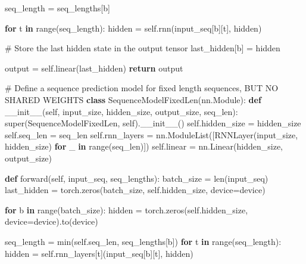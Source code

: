 \documentclass[
  letterpaper,
  DIV=11,
  numbers=noendperiod]{scrartcl}
\newenvironment{Shaded}{\begin{snugshade}}{\end{snugshade}}
\newcommand{\BuiltInTok}[1]{\textcolor[rgb]{0.00,0.23,0.31}{#1}}
\newcommand{\CommentTok}[1]{\textcolor[rgb]{0.37,0.37,0.37}{#1}}
\newcommand{\ControlFlowTok}[1]{\textcolor[rgb]{0.00,0.23,0.31}{\textbf{#1}}}
\newcommand{\FunctionTok}[1]{\textcolor[rgb]{0.28,0.35,0.67}{#1}}
\newcommand{\KeywordTok}[1]{\textcolor[rgb]{0.00,0.23,0.31}{\textbf{#1}}}
\newcommand{\NormalTok}[1]{\textcolor[rgb]{0.00,0.23,0.31}{#1}}
\newcommand{\OperatorTok}[1]{\textcolor[rgb]{0.37,0.37,0.37}{#1}}
\newcommand{\VariableTok}[1]{\textcolor[rgb]{0.07,0.07,0.07}{#1}}
\begin{document}
\begin{Shaded}
\begin{Highlighting}[]
\NormalTok{            seq\_length }\OperatorTok{=}\NormalTok{  seq\_lengths[b]}

            \ControlFlowTok{for}\NormalTok{ t }\KeywordTok{in} \BuiltInTok{range}\NormalTok{(seq\_length):}
\NormalTok{                hidden }\OperatorTok{=} \VariableTok{self}\NormalTok{.rnn(input\_seq[b][t], hidden)}

            \CommentTok{\# Store the last hidden state in the output tensor}
\NormalTok{            last\_hidden[b] }\OperatorTok{=}\NormalTok{ hidden}

\NormalTok{        output }\OperatorTok{=} \VariableTok{self}\NormalTok{.linear(last\_hidden)}
        \ControlFlowTok{return}\NormalTok{ output}

\CommentTok{\# Define a sequence prediction model for fixed length sequences, BUT NO SHARED WEIGHTS}
\KeywordTok{class}\NormalTok{ SequenceModelFixedLen(nn.Module):}
    \KeywordTok{def} \FunctionTok{\_\_init\_\_}\NormalTok{(}\VariableTok{self}\NormalTok{, input\_size, hidden\_size, output\_size, seq\_len):}
        \BuiltInTok{super}\NormalTok{(SequenceModelFixedLen, }\VariableTok{self}\NormalTok{).}\FunctionTok{\_\_init\_\_}\NormalTok{()}
        \VariableTok{self}\NormalTok{.hidden\_size }\OperatorTok{=}\NormalTok{ hidden\_size}
        \VariableTok{self}\NormalTok{.seq\_len }\OperatorTok{=}\NormalTok{ seq\_len}
        \VariableTok{self}\NormalTok{.rnn\_layers }\OperatorTok{=}\NormalTok{ nn.ModuleList([RNNLayer(input\_size, hidden\_size) }\ControlFlowTok{for}\NormalTok{ \_ }\KeywordTok{in} \BuiltInTok{range}\NormalTok{(seq\_len)])}
        \VariableTok{self}\NormalTok{.linear }\OperatorTok{=}\NormalTok{ nn.Linear(hidden\_size, output\_size)}

    \KeywordTok{def}\NormalTok{ forward(}\VariableTok{self}\NormalTok{, input\_seq, seq\_lengths):}
\NormalTok{        batch\_size }\OperatorTok{=} \BuiltInTok{len}\NormalTok{(input\_seq)}
\NormalTok{        last\_hidden }\OperatorTok{=}\NormalTok{ torch.zeros(batch\_size, }\VariableTok{self}\NormalTok{.hidden\_size, device}\OperatorTok{=}\NormalTok{device)}

        \ControlFlowTok{for}\NormalTok{ b }\KeywordTok{in} \BuiltInTok{range}\NormalTok{(batch\_size):}
\NormalTok{            hidden }\OperatorTok{=}\NormalTok{ torch.zeros(}\VariableTok{self}\NormalTok{.hidden\_size, device}\OperatorTok{=}\NormalTok{device).to(device)}

\NormalTok{            seq\_length }\OperatorTok{=} \BuiltInTok{min}\NormalTok{(}\VariableTok{self}\NormalTok{.seq\_len, seq\_lengths[b]) }
            \ControlFlowTok{for}\NormalTok{ t }\KeywordTok{in} \BuiltInTok{range}\NormalTok{(seq\_length):}
\NormalTok{                hidden }\OperatorTok{=} \VariableTok{self}\NormalTok{.rnn\_layers[t](input\_seq[b][t], hidden)}


\end{Highlighting}
\end{Shaded}
\end{document}

